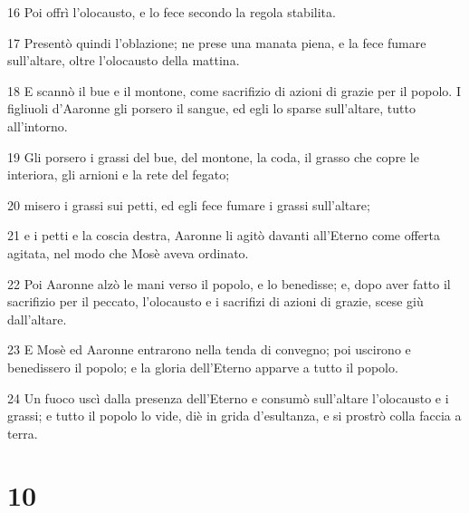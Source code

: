 \par 16 Poi offrì l'olocausto, e lo fece secondo la regola stabilita.
\par 17 Presentò quindi l'oblazione; ne prese una manata piena, e la fece fumare sull'altare, oltre l'olocausto della mattina.
\par 18 E scannò il bue e il montone, come sacrifizio di azioni di grazie per il popolo. I figliuoli d'Aaronne gli porsero il sangue, ed egli lo sparse sull'altare, tutto all'intorno.
\par 19 Gli porsero i grassi del bue, del montone, la coda, il grasso che copre le interiora, gli arnioni e la rete del fegato;
\par 20 misero i grassi sui petti, ed egli fece fumare i grassi sull'altare;
\par 21 e i petti e la coscia destra, Aaronne li agitò davanti all'Eterno come offerta agitata, nel modo che Mosè aveva ordinato.
\par 22 Poi Aaronne alzò le mani verso il popolo, e lo benedisse; e, dopo aver fatto il sacrifizio per il peccato, l'olocausto e i sacrifizi di azioni di grazie, scese giù dall'altare.
\par 23 E Mosè ed Aaronne entrarono nella tenda di convegno; poi uscirono e benedissero il popolo; e la gloria dell'Eterno apparve a tutto il popolo.
\par 24 Un fuoco uscì dalla presenza dell'Eterno e consumò sull'altare l'olocausto e i grassi; e tutto il popolo lo vide, diè in grida d'esultanza, e si prostrò colla faccia a terra.

\chapter{10}

